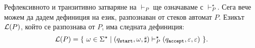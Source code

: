 Рефлексивното и транзитивно затваряне на $\vdash_P$ ще означаваме с $\vdash^\star_P$.
Сега вече можем да дадем дефиниция на език, разпознаван от стеков автомат $P$.
Езикът $\mathcal{L}(P)$, който се разпознава от $P$, има следната дефиниция:
\[\mathcal{L}(P) = \{\ \omega \in \Sigma^\star \mid (q_{\texttt{start}},\omega,\sharp) \vdash^\star_P (q_{\texttt{accept}},\varepsilon,\varepsilon)\ \}.\]



